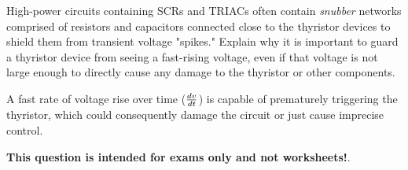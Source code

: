 

High-power circuits containing SCRs and TRIACs often contain {\it snubber} networks comprised of resistors and capacitors connected close to the thyristor devices to shield them from transient voltage "spikes."  Explain why it is important to guard a thyristor device from seeing a fast-rising voltage, even if that voltage is not large enough to directly cause any damage to the thyristor or other components.







A fast rate of voltage rise over time (${dv \over dt}$) is capable of prematurely triggering the thyristor, which could consequently damage the circuit or just cause imprecise control.







{\bf This question is intended for exams only and not worksheets!}.



